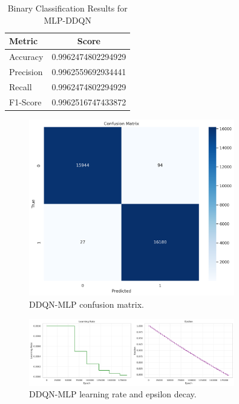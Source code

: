 \documentclass[12pt]{report}
\begin{document}
\begin{table}[H]
    \centering
    \caption{Binary Classification Results for MLP-DDQN}
    \label{tab:binary_ddqn_results}
    \begin{tabular}{@{}lc@{}}
        \toprule
        \textbf{Metric} & \textbf{Score} \\
        \midrule
        Accuracy & 0.9962474802294929 \\
        Precision & 0.9962559692934441 \\
        Recall & 0.9962474802294929 \\
        F1-Score & 0.9962516747433872 \\
        \bottomrule
    \end{tabular}
\end{table}
\begin{figure}[htbp]
    \centering
    \includegraphics[width=0.8\textwidth]{images/double_dqn_nn_confusion_matrix.png}
    \caption{DDQN-MLP confusion matrix.}
    \label{fig:ddqn_nn_confusion}
\end{figure}

\vspace{0.5cm}

\begin{figure}[htbp]
    \centering
    \includegraphics[width=0.8\textwidth]{images/double_dqn_nn_lr_epsilon.png}
    \caption{DDQN-MLP learning rate and epsilon decay.}
    \label{fig:ddqn_nn_lr_epsilon_nn}
\end{figure}
\end{document}
